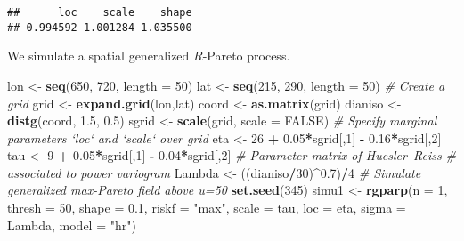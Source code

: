 \documentclass[]{book}
\newenvironment{Shaded}{\begin{snugshade}}{\end{snugshade}}
\newcommand{\CommentTok}[1]{\textcolor[rgb]{0.56,0.35,0.01}{\textit{#1}}}
\newcommand{\DataTypeTok}[1]{\textcolor[rgb]{0.13,0.29,0.53}{#1}}
\newcommand{\DecValTok}[1]{\textcolor[rgb]{0.00,0.00,0.81}{#1}}
\newcommand{\FloatTok}[1]{\textcolor[rgb]{0.00,0.00,0.81}{#1}}
\newcommand{\KeywordTok}[1]{\textcolor[rgb]{0.13,0.29,0.53}{\textbf{#1}}}
\newcommand{\NormalTok}[1]{#1}
\newcommand{\OperatorTok}[1]{\textcolor[rgb]{0.81,0.36,0.00}{\textbf{#1}}}
\newcommand{\OtherTok}[1]{\textcolor[rgb]{0.56,0.35,0.01}{#1}}
\newcommand{\StringTok}[1]{\textcolor[rgb]{0.31,0.60,0.02}{#1}}
\begin{document}
\begin{verbatim}
##      loc    scale    shape 
## 0.994592 1.001284 1.035500
\end{verbatim}

We simulate a spatial generalized \(R\)-Pareto process.

\begin{Shaded}
\begin{Highlighting}[]
\NormalTok{ lon <-}\StringTok{ }\KeywordTok{seq}\NormalTok{(}\DecValTok{650}\NormalTok{, }\DecValTok{720}\NormalTok{, }\DataTypeTok{length =} \DecValTok{50}\NormalTok{)}
\NormalTok{ lat <-}\StringTok{ }\KeywordTok{seq}\NormalTok{(}\DecValTok{215}\NormalTok{, }\DecValTok{290}\NormalTok{, }\DataTypeTok{length =} \DecValTok{50}\NormalTok{)}
 \CommentTok{# Create a grid}
\NormalTok{ grid <-}\StringTok{ }\KeywordTok{expand.grid}\NormalTok{(lon,lat)}
\NormalTok{ coord <-}\StringTok{ }\KeywordTok{as.matrix}\NormalTok{(grid)}
\NormalTok{ dianiso <-}\StringTok{ }\KeywordTok{distg}\NormalTok{(coord, }\FloatTok{1.5}\NormalTok{, }\FloatTok{0.5}\NormalTok{)}
\NormalTok{ sgrid <-}\StringTok{ }\KeywordTok{scale}\NormalTok{(grid, }\DataTypeTok{scale =} \OtherTok{FALSE}\NormalTok{)}
 \CommentTok{# Specify marginal parameters `loc` and `scale` over grid}
\NormalTok{ eta <-}\StringTok{ }\DecValTok{26} \OperatorTok{+}\StringTok{ }\FloatTok{0.05}\OperatorTok{*}\NormalTok{sgrid[,}\DecValTok{1}\NormalTok{] }\OperatorTok{-}\StringTok{ }\FloatTok{0.16}\OperatorTok{*}\NormalTok{sgrid[,}\DecValTok{2}\NormalTok{]}
\NormalTok{ tau <-}\StringTok{ }\DecValTok{9} \OperatorTok{+}\StringTok{ }\FloatTok{0.05}\OperatorTok{*}\NormalTok{sgrid[,}\DecValTok{1}\NormalTok{] }\OperatorTok{-}\StringTok{ }\FloatTok{0.04}\OperatorTok{*}\NormalTok{sgrid[,}\DecValTok{2}\NormalTok{]}
 \CommentTok{# Parameter matrix of Huesler--Reiss}
 \CommentTok{# associated to power variogram}
\NormalTok{ Lambda <-}\StringTok{ }\NormalTok{((dianiso}\OperatorTok{/}\DecValTok{30}\NormalTok{)}\OperatorTok{^}\FloatTok{0.7}\NormalTok{)}\OperatorTok{/}\DecValTok{4}
 \CommentTok{# Simulate generalized max-Pareto field above u=50}
 \KeywordTok{set.seed}\NormalTok{(}\DecValTok{345}\NormalTok{)}
\NormalTok{ simu1 <-}\StringTok{ }\KeywordTok{rgparp}\NormalTok{(}\DataTypeTok{n =} \DecValTok{1}\NormalTok{, }\DataTypeTok{thresh =} \DecValTok{50}\NormalTok{, }\DataTypeTok{shape =} \FloatTok{0.1}\NormalTok{, }\DataTypeTok{riskf =} \StringTok{"max"}\NormalTok{,}
                 \DataTypeTok{scale =}\NormalTok{ tau, }\DataTypeTok{loc =}\NormalTok{ eta, }\DataTypeTok{sigma =}\NormalTok{ Lambda, }\DataTypeTok{model =} \StringTok{"hr"}\NormalTok{)}

\end{Highlighting}
\end{Shaded}
\end{document}
